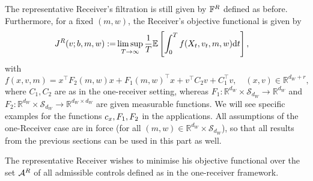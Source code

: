 \documentclass[a4paper,10pt]{article}
\newcommand{\EE}{\mathbb{E}}
\newcommand{\RR}{\mathbb{R}}
\newcommand{\D}{\mathrm{d}}
\theoremstyle{definition}
\theoremstyle{plain}
\numberwithin{equation}{section}
\begin{document}
The representative Receiver's filtration is still given by $\mathbb  F^{\rm R}$ defined as before.
Furthermore, for a fixed $(m,w)$, the Receiver's objective functional is given by
\begin{align*}
 J^{\rm R}(v; b, m,w) 
 := & \limsup_{T \to \infty}\frac{1}{T}\EE \left[ \int_0^T f(X_t,v_t, m ,w) \D t \right],
\end{align*}
with
$$
f(x,v, m) = x^\top F_2 (m,w) x +F_1 (m,w) ^\top x +v^\top C_2 v + C_1 ^\top v , \quad (x,v) \in \RR^{d_W + r},
$$
where $C_1, C_2$ are as in the one-receiver setting, whereas $F_1: \RR^{d_W} \times \mathcal S_{d_W} \to \RR^{d_W}$ and $F_2: \RR^{d_W} \times \mathcal S_{d_W}  \to \RR^{d_W \times d_W}$ are given measurable functions. We will see specific examples for the functions $c_{\rm x}, F_1,F_2$ in the applications. All assumptions of the one-Receiver case are in force (for all $(m,w) \in \RR^{d_W} \times \mathcal S_{d_W} $), so that all results from the previous sections can be used in this part as well.

The representative Receiver wishes to minimise his objective functional over the set $\mathcal A^{\rm R}$ of all admissible controls defined as in the one-receiver framework.
\end{document}
